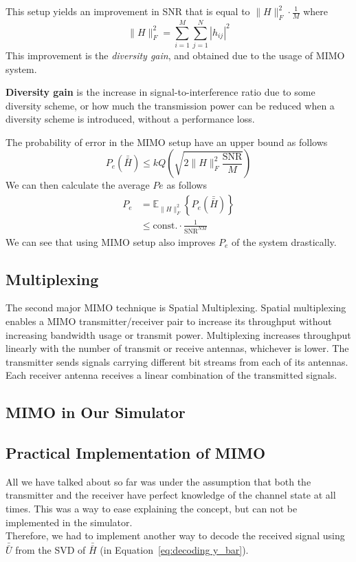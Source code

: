 This setup yields an improvement in SNR that is equal to $\|H\|_F^2 \cdot \frac{1}{M}$ where
\[\|H\|_F^2 = \sum_{i=1}^{M} \sum_{j=1}^{N} |h_{ij}|^2\]
This improvement is the \emph{diversity gain}, and obtained due to the usage of MIMO system.  
\begin{GrayBox}
    \textbf{Diversity gain} is the increase in signal-to-interference ratio due to some diversity scheme, or how much the transmission power can be reduced when a diversity scheme is introduced, without a performance loss.
\end{GrayBox}

The probability of error in the MIMO setup have an upper bound as follows
\[ P_e \left( \bar{\bar{H}} \right) \leq k Q\left( \sqrt{ 2 \|H\|_F^2 \frac{\text{SNR}}{M} } \right) \] 
We can then calculate the average $Pe$ as follows
\begin{equation}
    \label{eq:avg Pe mimo}
    \begin{aligned}
        P_e &= \mathbb{E}_{\|H\|_F^2} \left\{ P_e \left( \bar{\bar{H}} \right) \right\} \\
        & \leq \text{const.} \cdot \frac{1}{\text{SNR}^{NM}}
    \end{aligned}
\end{equation}
We can see that using MIMO setup also improves $P_e$ of the system drastically.

\subsection{Multiplexing}
\label{subsection:MIMO-Multiplexing}
The second major MIMO technique is Spatial Multiplexing. Spatial multiplexing enables a MIMO transmitter/receiver pair to increase its throughput without increasing bandwidth usage or transmit power. Multiplexing increases throughput linearly with the number of transmit or receive antennas, whichever is lower. The transmitter sends signals carrying different bit streams from each of its antennas. Each receiver antenna receives a linear combination of the transmitted signals.

\subsection{MIMO in Our Simulator}

\subsection{Practical Implementation of MIMO}
All we have talked about so far was under the assumption that both the transmitter and the receiver have perfect knowledge of the channel state at all times. This was a way to ease explaining the concept, but can not be implemented in the simulator.\\
Therefore, we had to implement another way to decode the received signal using $\bar{\bar{U}}$ from the SVD of $\bar{\bar{H}}$ (in Equation~\ref{eq:decoding y_bar}).